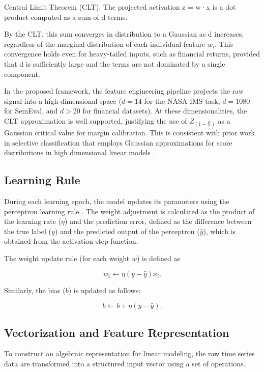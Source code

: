 \documentclass[conference]{IEEEtran}
\begin{document}
Central Limit Theorem (CLT). The projected activation z = w·x is a dot product computed as a sum of d terms.

By the CLT, this sum converges in distribution to a Gaussian as d increases, regardless of the marginal distribution of each individual feature $w_i$. This convergence holds even for heavy-tailed inputs, such as financial returns, provided that d is sufficiently large and the terms are not dominated by a single component.

In the proposed framework, the feature engineering pipeline projects the raw signal into a high-dimensional space ($d = 14$ for the NASA IMS task, $d = 1080$ for SemEval, and $d > 20$ for financial datasets). At these dimensionalities, the CLT approximation is well supported, justifying the use of  $Z_{(1 - \frac{E}{2})}$ as a Gaussian critical value for margin calibration. This is consistent with prior work in selective classification that employs Gaussian approximations for score distributions in high dimensional linear models \cite{b8}.

\subsection{Learning Rule}

During each learning epoch, the model updates its parameters using the perceptron learning rule \cite{b7}. The weight adjustment is calculated as the product of the learning rate ($\eta$) and the prediction error, defined as the difference between the true label ($y$) and the predicted output of the perceptron ($\hat{y}$), which is obtained from the activation step function.

The weight update rule (for each weight $w$) is defined as

\begin{equation}
w_i \leftarrow \eta (y - \hat{y}) x_i.
\end{equation}

Similarly, the bias ($b$) is updated as follows:

\begin{equation}
b \leftarrow b + \eta (y - \hat{y}).
\end{equation}

\subsection{Vectorization and Feature Representation}

To construct an algebraic representation for linear modeling, the raw time series data are transformed into a structured input vector using a set of operations.
\end{document}
